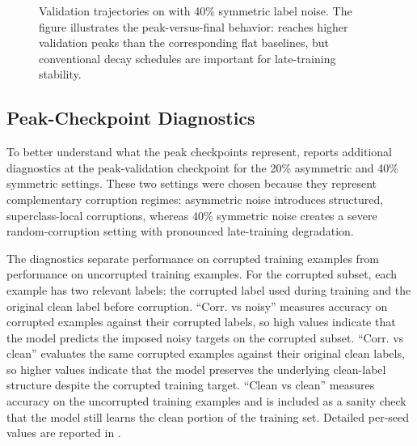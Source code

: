\begin{figure}[t]
    \centering
    \caption[
        Validation trajectories on \cifar{} with 40\% symmetric label noise
    ]{
        Validation trajectories on \cifar{} with 40\% symmetric label noise. The figure illustrates the peak-versus-final behavior: \method{} reaches higher validation peaks than the corresponding flat baselines, but conventional decay schedules are important for late-training stability.
    }
    \label{fig:cifar-sym40-curves}
\end{figure}

\FloatBarrier
\subsection{Peak-Checkpoint Diagnostics}
\label{sec:cifar-noisy-checkpoint-diagnostics}



To better understand what the peak checkpoints represent,
 reports additional diagnostics at the
peak-validation checkpoint for the 20\% asymmetric and 40\% symmetric settings. These
two settings were chosen because they represent complementary corruption regimes:
asymmetric noise introduces structured, superclass-local corruptions, whereas 40\%
symmetric noise creates a severe random-corruption setting with pronounced
late-training degradation.

The diagnostics separate performance on corrupted training examples from performance
on uncorrupted training examples. For the corrupted subset, each example has two
relevant labels: the corrupted label used during training and the original clean label
before corruption. ``Corr. vs noisy'' measures accuracy on corrupted examples against
their corrupted labels, so high values indicate that the model predicts the imposed noisy
targets on the corrupted subset. ``Corr. vs clean'' evaluates the same corrupted examples
against their original clean labels, so higher values indicate that the model preserves
the underlying clean-label structure despite the corrupted training target. ``Clean vs
clean'' measures accuracy on the uncorrupted training examples and is included as a
sanity check that the model still learns the clean portion of the training set. Detailed
per-seed values are reported in .

